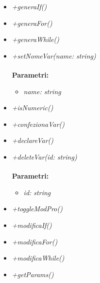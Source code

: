 \begin{itemize}
\begin{itemize}
\begin{itemize}
    		\end{itemize}
    		\item \emph{+generaIf()}\\
    		
    		\item \emph{+generaFor()}\\
    		
    		\item \emph{+generaWhile()}\\
    		
    		\item \emph{+setNomeVar(name: string)}\\
    		\\
    		\textbf{Parametri:}
    		\begin{itemize}
    			\item \emph{name: string}\\
    			
    		\end{itemize}
    		\item \emph{+isNumeric()}\\
    		
    		\item \emph{+confezionaVar()}\\
    		
    		\item \emph{+declareVar()}\\
    		
    		\item \emph{+deleteVar(id: string)}\\
    		\\
    		\textbf{Parametri:}
    		\begin{itemize}
    			\item \emph{id: string}\\
    			
    		\end{itemize}
    		\item \emph{+toggleModPro()}\\
    		
    		\item \emph{+modificaIf()}\\
    		
    		\item \emph{+modificaFor()}\\
    		
    		\item \emph{+modificaWhile()}\\
    		
    		\item \emph{+getParams()}\\
    		
		\end{itemize}
\end{itemize}